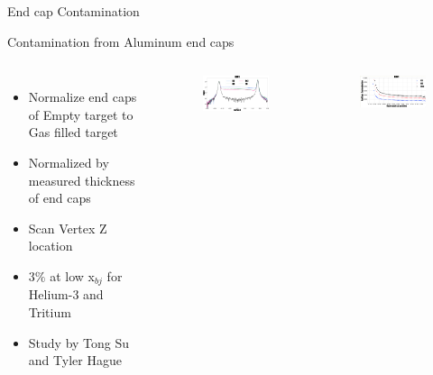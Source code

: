 \documentclass{beamer}
\begin{document}
\begin{frame}{End cap Contamination}
	\begin{block}{Contamination from Aluminum end caps}
		\begin{columns}
		\begin{itemize}
			\item Normalize end caps of Empty target to Gas filled target
			\item Normalized by measured thickness of end caps
			\item Scan Vertex Z location
			\item $3\%$ at low x$_{bj}$ for Helium-3 and Tritium
			\item Study by Tong Su and Tyler Hague 
		\end{itemize}
	
		\begin{figure}
			\includegraphics[width=5.0cm]{../images/ECC_kin1.pdf}
		\end{figure}
		\begin{figure}
			\includegraphics[width=5.0cm]{../images/ECC1_kin1.pdf}
		\end{figure}
	
		\end{columns}		
	\end{block}

\end{frame}
\end{document}

